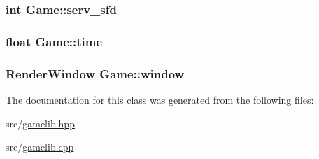 \subsubsection[{\texorpdfstring{serv\+\_\+sfd}{serv_sfd}}]{\setlength{\rightskip}{0pt plus 5cm}int Game\+::serv\+\_\+sfd\hspace{0.3cm}{\ttfamily [private]}}\hypertarget{class_game_ac698cf1904287abc3021f0b6fa7411a4}{}\label{class_game_ac698cf1904287abc3021f0b6fa7411a4}
\subsubsection[{\texorpdfstring{time}{time}}]{\setlength{\rightskip}{0pt plus 5cm}float Game\+::time\hspace{0.3cm}{\ttfamily [private]}}\hypertarget{class_game_ace6d6f7c808735dabb0e4d46e9f95495}{}\label{class_game_ace6d6f7c808735dabb0e4d46e9f95495}
\subsubsection[{\texorpdfstring{window}{window}}]{\setlength{\rightskip}{0pt plus 5cm}Render\+Window Game\+::window\hspace{0.3cm}{\ttfamily [private]}}\hypertarget{class_game_a8773f0f2562575ce000b0a6abb6c87ed}{}\label{class_game_a8773f0f2562575ce000b0a6abb6c87ed}


The documentation for this class was generated from the following files\+:\begin{DoxyCompactItemize}
\item 
src/\hyperlink{gamelib_8hpp}{gamelib.\+hpp}\item 
src/\hyperlink{gamelib_8cpp}{gamelib.\+cpp}\end{DoxyCompactItemize}
